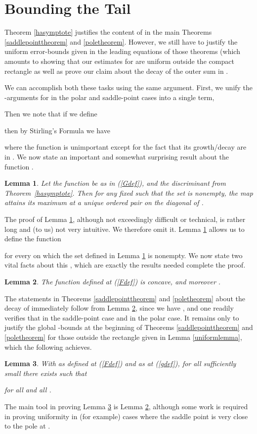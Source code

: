 \documentclass[proceedings]{aofa}
\newtheorem{lemma}{Lemma}
\begin{document}
\section{Bounding the Tail}\label{tailsection}
Theorem \ref{hasymptote} justifies the content of  in the main Theorems \ref{saddlepointtheorem} and \ref{poletheorem}. However, we still have to justify the uniform  error-bounds given in the leading equations of those theorems (which amounts to showing that our estimates for  are uniform outside the compact rectangle  as well as prove our claim about the decay of the outer sum in . 

We can accomplish both these tasks using the same argument. First, we unify the -arguments for  in the polar and saddle-point cases into a single term,

Then we note that if we define

then by Stirling's Formula we have 

where the function  is unimportant except for the fact that its growth/decay are in . We now state an important and somewhat surprising result about the function .
\begin{lemma}\label{maxlemma}
Let the function  be as in (\ref{Gdef}), and   the discriminant from Theorem~\ref{hasymptote}. Then for any fixed  such that the set\;  is nonempty, the map  attains its maximum at a unique ordered pair  on the diagonal of . 
\end{lemma}
The proof of Lemma \ref{maxlemma}, although not exceedingly difficult or technical, is rather long and (to us) not very intuitive. We therefore omit it.
Lemma \ref{maxlemma} allows us to define the function

for every  on which the set  defined in Lemma \ref{maxlemma} is nonempty. We now state two vital facts about this , which are exactly the results needed complete the proof.
\begin{lemma}\label{Flemma}
The function  defined at (\ref{Fdef}) is concave, and moreover .
\end{lemma}
The statements in Theorems \ref{saddlepointtheorem} and \ref{poletheorem} about the decay of  immediately follow from Lemma \ref{Flemma}, since we have
,
and one readily verifies that  in the saddle-point case and  in the polar case.
It remains only to justify the global -bounds at the beginning of Theorems \ref{saddlepointtheorem} and \ref{poletheorem} for those  outside the rectangle  given in Lemma \ref{uniformlemma}, which the following achieves.
\begin{lemma}\label{uniformboundlemma}
With  as defined at (\ref{Fdef}) and  as at (\ref{gdef}), for all sufficiently small  there exists  such that

for all  and all .
\end{lemma}
The main tool in proving Lemma \ref{uniformboundlemma} is Lemma \ref{Flemma}, although some work is required in proving uniformity in (for example) cases where the saddle point  is very close to the pole at .
\end{document}
